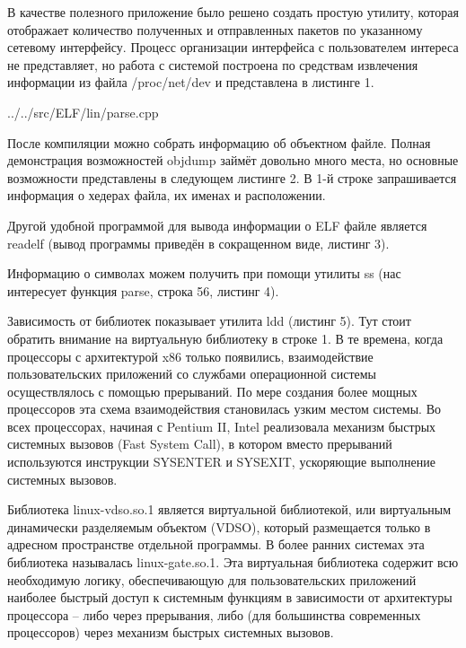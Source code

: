 В качестве полезного приложение было решено создать простую утилиту, которая отображает количество полученных и отправленных пакетов по указанному сетевому интерфейсу. Процесс организации интерфейса с пользователем интереса не представляет, но работа с системой построена по средствам извлечения информации из файла /proc/net/dev и представлена в листинге 1.


{../../src/ELF/lin/parse.cpp}

После компиляции можно собрать информацию об объектном файле. Полная демонстрация возможностей objdump займёт довольно много места, но основные возможности представлены в следующем листинге 2. В 1-й строке запрашивается информация о хедерах файла, их именах и расположении.



Другой удобной программой для вывода информации о ELF файле является readelf (вывод программы приведён в сокращенном виде, листинг 3).



Информацию о символах можем получить при помощи утилиты ss (нас интересует функция parse, строка 56, листинг 4).



Зависимость от библиотек показывает утилита ldd (листинг 5). Тут стоит обратить внимание на виртуальную библиотеку в строке 1. В те времена, когда процессоры с архитектурой x86 только появились, взаимодействие пользовательских приложений со службами операционной системы осуществлялось с помощью прерываний. По мере создания более мощных процессоров эта схема взаимодействия становилась узким местом системы. Во всех процессорах, начиная с Pentium II, Intel реализовала механизм быстрых системных вызовов (Fast System Call), в котором вместо прерываний используются инструкции SYSENTER и SYSEXIT, ускоряющие выполнение системных вызовов.

Библиотека linux-vdso.so.1 является виртуальной библиотекой, или виртуальным динамически разделяемым объектом (VDSO), который размещается только в адресном пространстве отдельной программы. В более ранних системах эта библиотека называлась linux-gate.so.1. Эта виртуальная библиотека содержит всю необходимую логику, обеспечивающую для пользовательских приложений наиболее быстрый доступ к системным функциям в зависимости от архитектуры процессора -- либо через прерывания, либо (для большинства современных процессоров) через механизм быстрых системных вызовов.

